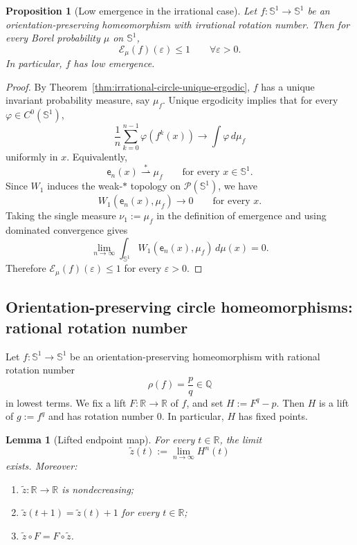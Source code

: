 \documentclass[12pt,a4paper,twoside]{article}
\theoremstyle{plain}
\newtheorem{proposition}[theorem]{Proposition}
\newtheorem{lemma}[theorem]{Lemma}
\theoremstyle{definition}
\newcommand{\cE}{{\mathcal E}}
\newcommand{\cP}{{\mathcal P}}
\newcommand{\emp}{\mathsf e}
\newcommand{\wto}{\overset{*}{\rightharpoonup}}
\begin{document}
\begin{proposition}[Low emergence in the irrational case]
\label{prop:circle-irrational-low}
Let \(f:\mathbb S^1\to\mathbb S^1\) be an orientation-preserving
homeomorphism with irrational rotation number. Then for every Borel
probability \(\mu\) on \(\mathbb S^1\),
\[
\cE_\mu(f)(\varepsilon)\le 1
\qquad\forall \varepsilon>0.
\]
In particular, \(f\) has low emergence.
\end{proposition}

\begin{proof}
By Theorem~\ref{thm:irrational-circle-unique-ergodic}, \(f\) has a unique
invariant probability measure, say \(\mu_f\). Unique ergodicity implies that
for every \(\varphi\in C^0(\mathbb S^1)\),
\[
\frac1n\sum_{k=0}^{n-1}\varphi(f^k(x))
\longrightarrow
\int\varphi\,d\mu_f
\]
uniformly in \(x\). Equivalently,
\[
\emp_n(x)\wto \mu_f
\qquad\text{for every }x\in\mathbb S^1.
\]
Since \(W_1\) induces the weak-\(\ast\) topology on \(\cP(\mathbb S^1)\), we
have
\[
W_1(\emp_n(x),\mu_f)\to0
\qquad\text{for every }x.
\]
Taking the single measure \(\nu_1:=\mu_f\) in the definition of emergence and
using dominated convergence gives
\[
\lim_{n\to\infty}
\int_{\mathbb S^1}W_1(\emp_n(x),\mu_f)\,d\mu(x)=0.
\]
Therefore \(\cE_\mu(f)(\varepsilon)\le1\) for every \(\varepsilon>0\).
\end{proof}

\subsection{Orientation-preserving circle homeomorphisms: rational rotation number}

Let \(f:\mathbb S^1\to\mathbb S^1\) be an orientation-preserving
homeomorphism with rational rotation number
\[
\rho(f)=\frac pq\in\mathbb Q
\]
in lowest terms. We fix a lift \(F:\mathbb R\to\mathbb R\) of \(f\), and set $H:=F^q-p$. Then \(H\) is a lift of $g:=f^q$ and has rotation number \(0\). In particular, \(H\) has fixed points.

\begin{lemma}[Lifted endpoint map]
\label{lem:lifted-endpoint-map}
For every \(t\in\mathbb R\), the limit
\[
\widetilde z(t):=\lim_{n\to\infty}H^n(t)
\]
exists. Moreover:
\begin{enumerate}[label=(\roman*)]
\item \(\widetilde z:\mathbb R\to\mathbb R\) is nondecreasing;
\item \(\widetilde z(t+1)=\widetilde z(t)+1\) for every \(t\in\mathbb R\);
\item \(\widetilde z\circ F=F\circ \widetilde z\).
\end{enumerate}
\end{lemma}
\end{document}
